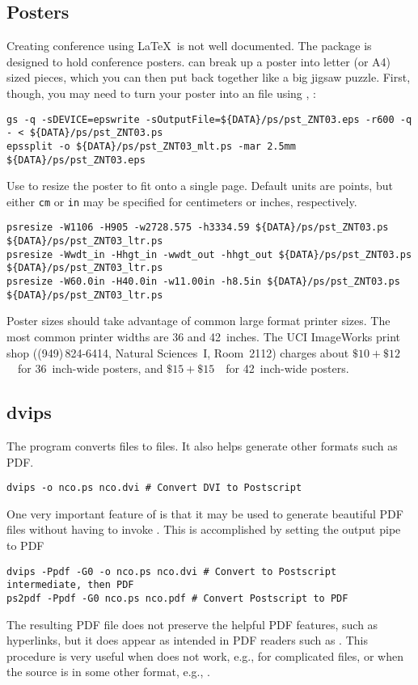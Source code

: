 \documentclass[12pt]{article}
\begin{document}
\subsection[Posters]{Posters}\label{sxn:pst}
Creating conference  using \LaTeX\ is not well documented.
The  package is designed to hold conference posters.
 can break up a poster into letter (or A4) sized
pieces, which you can then put back together like a big jigsaw puzzle.
First, though, you may need to turn your poster into an 
file using , :
\begin{verbatim}
gs -q -sDEVICE=epswrite -sOutputFile=${DATA}/ps/pst_ZNT03.eps -r600 -q - < ${DATA}/ps/pst_ZNT03.ps
epssplit -o ${DATA}/ps/pst_ZNT03_mlt.ps -mar 2.5mm ${DATA}/ps/pst_ZNT03.eps
\end{verbatim}
Use  to resize the poster to fit onto a single page.
Default units are points, but either \verb'cm' or \verb'in' may be
specified for centimeters or inches, respectively.
\begin{verbatim}
psresize -W1106 -H905 -w2728.575 -h3334.59 ${DATA}/ps/pst_ZNT03.ps ${DATA}/ps/pst_ZNT03_ltr.ps
psresize -Wwdt_in -Hhgt_in -wwdt_out -hhgt_out ${DATA}/ps/pst_ZNT03.ps ${DATA}/ps/pst_ZNT03_ltr.ps
psresize -W60.0in -H40.0in -w11.00in -h8.5in ${DATA}/ps/pst_ZNT03.ps ${DATA}/ps/pst_ZNT03_ltr.ps
\end{verbatim}
Poster sizes should take advantage of common large format printer
sizes. 
The most common printer widths are 36 and 42~inches.
The UCI ImageWorks print shop ((949)\,824-6414, Natural Sciences~I, 
Room~2112) charges about 
$\$10 + \$12$~\xft\ for 36~inch-wide posters, and 
$\$15 + \$15$~\xft\ for 42~inch-wide posters.

\subsection[dvips]{dvips}\label{sxn:dvips}
The  program converts  files to
 files.
It also helps generate other formats such as PDF.
\begin{verbatim}
dvips -o nco.ps nco.dvi # Convert DVI to Postscript
\end{verbatim}
One very important feature of  is that it may be used to
generate beautiful PDF files without having to invoke
.
This is accomplished by setting the  output pipe to PDF
\begin{verbatim}
dvips -Ppdf -G0 -o nco.ps nco.dvi # Convert to Postscript intermediate, then PDF
ps2pdf -Ppdf -G0 nco.ps nco.pdf # Convert Postscript to PDF
\end{verbatim}
The resulting PDF file does not preserve the helpful PDF features,
such as hyperlinks, but it does appear as intended in PDF readers such
as .
This procedure is very useful when  does not work,
e.g., for complicated files, or when the source is in some other
format, e.g., \TeXInfo{}.
\end{document}

